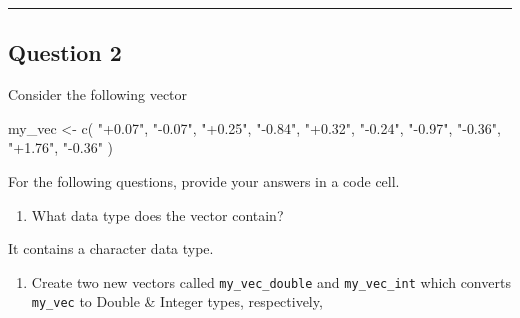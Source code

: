 \documentclass[
  letterpaper,
  DIV=11,
  numbers=noendperiod]{scrartcl}
\newenvironment{Shaded}{\begin{snugshade}}{\end{snugshade}}
\newcommand{\FunctionTok}[1]{\textcolor[rgb]{0.28,0.35,0.67}{#1}}
\newcommand{\NormalTok}[1]{\textcolor[rgb]{0.00,0.23,0.31}{#1}}
\newcommand{\OtherTok}[1]{\textcolor[rgb]{0.00,0.23,0.31}{#1}}
\newcommand{\StringTok}[1]{\textcolor[rgb]{0.13,0.47,0.30}{#1}}
\providecommand{\tightlist}{%
  \setlength{\itemsep}{0pt}\setlength{\parskip}{0pt}}\usepackage{longtable,booktabs,array}
\begin{document}
\begin{center}\rule{0.5\linewidth}{0.5pt}\end{center}

\hypertarget{question-2}{%
\subsection{Question 2}\label{question-2}}

\begin{tcolorbox}[enhanced jigsaw, toprule=.15mm, breakable, rightrule=.15mm, coltitle=black, colframe=quarto-callout-tip-color-frame, bottomtitle=1mm, toptitle=1mm, titlerule=0mm, opacityback=0, title=\textcolor{quarto-callout-tip-color}{\faLightbulb}\hspace{0.5em}{30 points}, bottomrule=.15mm, arc=.35mm, leftrule=.75mm, colback=white, opacitybacktitle=0.6, left=2mm, colbacktitle=quarto-callout-tip-color!10!white]

\end{tcolorbox}

Consider the following vector

\begin{Shaded}
\begin{Highlighting}[]
\NormalTok{my\_vec }\OtherTok{\textless{}{-}} \FunctionTok{c}\NormalTok{(}
    \StringTok{"+0.07"}\NormalTok{,}
    \StringTok{"{-}0.07"}\NormalTok{,}
    \StringTok{"+0.25"}\NormalTok{,}
    \StringTok{"{-}0.84"}\NormalTok{,}
    \StringTok{"+0.32"}\NormalTok{,}
    \StringTok{"{-}0.24"}\NormalTok{,}
    \StringTok{"{-}0.97"}\NormalTok{,}
    \StringTok{"{-}0.36"}\NormalTok{,}
    \StringTok{"+1.76"}\NormalTok{,}
    \StringTok{"{-}0.36"}
\NormalTok{)}
\end{Highlighting}
\end{Shaded}

For the following questions, provide your answers in a code cell.

\begin{enumerate}
\def\labelenumi{\arabic{enumi}.}
\tightlist
\item
  What data type does the vector contain?
\end{enumerate}

It contains a character data type.

\begin{enumerate}
\def\labelenumi{\arabic{enumi}.}
\tightlist
\item
  Create two new vectors called \texttt{my\_vec\_double} and
  \texttt{my\_vec\_int} which converts \texttt{my\_vec} to Double \&
  Integer types, respectively,
\end{enumerate}
\end{document}
